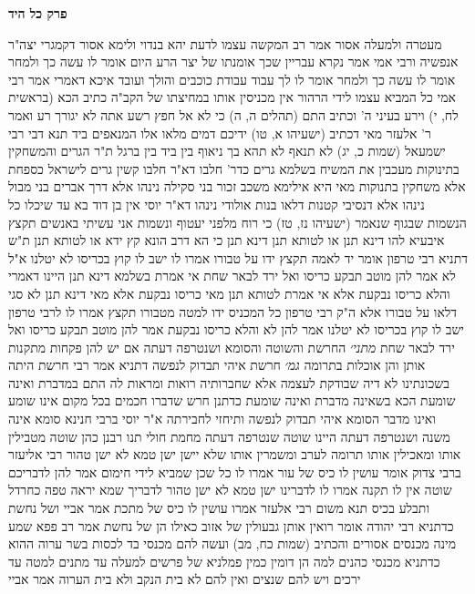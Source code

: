 \documentclass[12pt, openany]{book}
\newcommand{\sethebfont}{
\fontsize{10.5pt}{21.0pt} \selectfont
}
\newcommand{\twocol}[1]{
	{\sethebfont \begin{multicols}{2}
			#1
	\end{multicols}}	
}
\newcommand{\chapname}{}
\newcommand{\newchap}[1]{
	\addcontentsline{toc}{chapter}{#1}
	\renewcommand{\chapname}{#1}
		\begin{center}
			\textbf{%
\fontsize{16pt}{16pt}\selectfont
				#1}
		\end{center}
}
\begin{document}
\newchap{פרק  כל היד}
\twocol{מעטרה ולמעלה אסור 
אמר רב המקשה עצמו לדעת יהא בנדוי ולימא אסור דקמגרי יצה"ר אנפשיה ורבי אמי אמר נקרא עבריין שכך אומנתו של יצר הרע היום אומר לו עשה כך ולמחר אומר לו עשה כך ולמחר אומר לו לך עבוד עבודת כוכבים והולך ועובד 
איכא דאמרי אמר רבי אמי כל המביא עצמו לידי הרהור אין מכניסין אותו במחיצתו של הקב"ה כתיב הכא (בראשית לח, י) וירע בעיני ה' וכתיב התם (תהלים ה, ה) כי לא אל חפץ רשע אתה לא יגורך רע 
ואמר ר' אלעזר מאי דכתיב (ישעיהו א, טו) ידיכם דמים מלאו אלו המנאפים ביד תנא דבי רבי ישמעאל (שמות כ, יג) לא תנאף לא תהא בך ניאוף בין ביד בין ברגל 
ת"ר הגרים והמשחקין בתינוקות מעכבין את המשיח בשלמא גרים כדר' חלבו דא"ר חלבו קשין גרים לישראל כספחת אלא משחקין בתנוקות מאי היא 
אילימא משכב זכור בני סקילה נינהו אלא דרך אברים בני מבול נינהו 
אלא דנסיבי קטנות דלאו בנות אולודי נינהו דא"ר יוסי אין בן דוד בא עד שיכלו כל הנשמות שבגוף שנאמר (ישעיהו נז, טז) כי רוח מלפני יעטוף ונשמות אני עשיתי
באנשים תקצץ איבעיא להו דינא תנן או לטותא תנן דינא תנן כי הא דרב הונא קץ ידא או לטותא תנן 
ת"ש דתניא רבי טרפון אומר יד לאמה תקצץ ידו על טבורו אמרו לו ישב לו קוץ בכריסו לא יטלנו א"ל לא אמר להן מוטב תבקע כריסו ואל ירד לבאר שחת 
אי אמרת בשלמא דינא תנן היינו דאמרי והלא כריסו נבקעת אלא אי אמרת לטותא תנן מאי כריסו נבקעת אלא מאי דינא תנן לא סגי דלאו על טבורו 
אלא ה"ק רבי טרפון כל המכניס ידו למטה מטבורו תקצץ אמרו לו לרבי טרפון ישב לו קוץ בכריסו לא יטלנו אמר להן לא והלא כריסו נבקעת אמר להן מוטב תבקע כריסו ואל ירד לבאר שחת
{\large\emph{מתני׳}} החרשת והשוטה והסומא ושנטרפה דעתה אם יש להן פקחות מתקנות אותן והן אוכלות בתרומה
{\large\emph{גמ׳}} חרשת איהי תבדוק לנפשה דתניא אמר רבי חרשת היתה בשכונתינו לא דיה שבודקת לעצמה אלא שחברותיה רואות ומראות לה 
התם במדברת ואינה שומעת הכא בשאינה מדברת ואינה שומעת כדתנן חרש שדברו חכמים בכל מקום אינו שומע ואינו מדבר
הסומא איהי תבדוק לנפשה ותיחזי לחבירתה א"ר יוסי ברבי חנינא סומא אינה משנה
ושנטרפה דעתה היינו שוטה שנטרפה דעתה מחמת חולי 
תנו רבנן כהן שוטה מטבילין אותו ומאכילין אותו תרומה לערב ומשמרין אותו שלא יישן ישן טמא לא ישן טהור 
רבי אליעזר ברבי צדוק אומר עושין לו כיס של עור אמרו לו כל שכן שמביא לידי חימום אמר להן לדבריכם שוטה אין לו תקנה 
אמרו לו לדברינו ישן טמא לא ישן טהור לדבריך שמא יראה טפה כחרדל ותבלע בכיס 
תנא משום רבי אלעזר אמרו עושין לו כיס של מתכת 
אמר אביי ושל נחשת כדתניא רבי יהודה אומר רואין אותן גבעולין של אזוב כאילו הן של נחשת 
אמר רב פפא שמע מינה מכנסים אסורים והכתיב (שמות כח, מב) ועשה להם מכנסי בד לכסות בשר ערוה 
ההוא כדתניא מכנסי כהנים למה הן דומין כמין פמלניא של פרשים למעלה עד מתנים למטה עד ירכים ויש להם שנצים ואין להם לא בית הנקב ולא בית הערוה 
אמר אביי}
\end{document}
